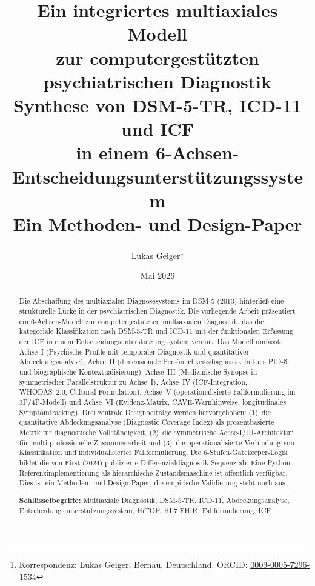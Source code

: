 \documentclass[11pt,a4paper]{article}
\begin{document}

\title{\textbf{\huge Ein integriertes multiaxiales Modell\\zur computergest\"utzten psychiatrischen Diagnostik}\\[0.5em]
\Large Synthese von DSM-5-TR, ICD-11 und ICF\\in einem 6-Achsen-Entscheidungsunterst\"utzungssystem\\[0.3em]
\large Ein Methoden- und Design-Paper}

\author[1]{Lukas Geiger\thanks{Korrespondenz: Lukas Geiger, Bernau, Deutschland. ORCID: \href{https://orcid.org/0009-0005-7296-1534}{0009-0005-7296-1534}}}

\date{Mai 2026}

\maketitle

\begin{abstract}
\noindent Die Abschaffung des multiaxialen Diagnosesystems im DSM-5 (2013) hinterlie\ss{} eine strukturelle L\"ucke in der psychiatrischen Diagnostik. Die vorliegende Arbeit pr\"asentiert ein 6-Achsen-Modell zur computergest\"utzten multiaxialen Diagnostik, das die kategoriale Klassifikation nach DSM-5-TR und ICD-11 mit der funktionalen Erfassung der ICF in einem Entscheidungsunterst\"utzungssystem vereint. Das Modell umfasst: Achse~I (Psychische Profile mit temporaler Diagnostik und quantitativer Abdeckungsanalyse), Achse~II (dimensionale Pers\"onlichkeitsdiagnostik mittels PID-5 und biographische Kontextualisierung), Achse~III (Medizinische Synopse in symmetrischer Parallelstruktur zu Achse~I), Achse~IV (ICF-Integration, WHODAS~2.0, Cultural Formulation), Achse~V (operationalisierte Fallformulierung im 3P/4P-Modell) und Achse~VI (Evidenz-Matrix, CAVE-Warnhinweise, longitudinales Symptomtracking). Drei zentrale Designbeitr\"age werden hervorgehoben: (1)~die quantitative Abdeckungsanalyse (Diagnostic Coverage Index) als prozentbasierte Metrik f\"ur diagnostische Vollst\"andigkeit, (2)~die symmetrische Achse-I/III-Architektur f\"ur multi-professionelle Zusammenarbeit und (3)~die operationalisierte Verbindung von Klassifikation und individualisierter Fallformulierung. Die 6-Stufen-Gatekeeper-Logik bildet die von First (2024) publizierte Differenzialdiagnostik-Sequenz ab. Eine Python-Referenzimplementierung als hierarchische Zustandsmaschine ist \"offentlich verf\"ugbar. Dies ist ein Methoden- und Design-Paper; die empirische Validierung steht noch aus.

\vspace{0.5em}
\noindent \textbf{Schl\"usselbegriffe:} Multiaxiale Diagnostik, DSM-5-TR, ICD-11, Abdeckungsanalyse, Entscheidungsunterst\"utzungssystem, HiTOP, HL7 FHIR, Fallformulierung, ICF
\end{abstract}
\end{document}
